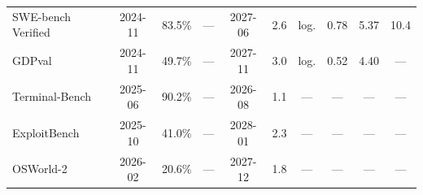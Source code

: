 \begin{table}[t]
\begin{tabular}{lccccccccc}
SWE-bench Verified  & 2024-11 & 83.5\% & ---     & 2027-06 & 2.6 & log. & 0.78 & 5.37 & 10.4 \\
GDPval              & 2024-11 & 49.7\% & ---     & 2027-11 & 3.0 & log. & 0.52 & 4.40 & ---  \\
Terminal-Bench      & 2025-06 & 90.2\% & ---     & 2026-08 & 1.1 & ---  & ---  & ---  & ---  \\
ExploitBench        & 2025-10 & 41.0\% & ---     & 2028-01 & 2.3 & ---  & ---  & ---  & ---  \\
OSWorld-2           & 2026-02 & 20.6\% & ---     & 2027-12 & 1.8 & ---  & ---  & ---  & ---  \\
\bottomrule
\end{tabular}
\end{table}
